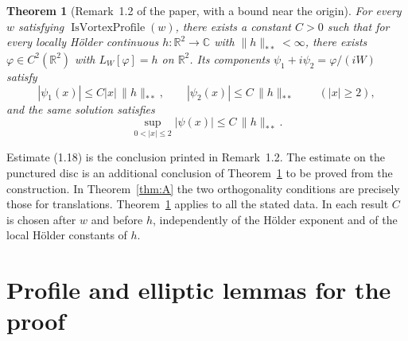 \documentclass[11pt]{amsart}
\newtheorem{theorem}{Theorem}
\theoremstyle{definition}
\newcommand{\C}{\mathbb{C}}
\newcommand{\R}{\mathbb{R}}
\newcommand{\nss}[1]{\lVert #1\rVert_{**}}
\newcommand{\vprofile}{\operatorname{IsVortexProfile}}
\begin{document}
\begin{theorem}[Remark~1.2 of the paper, with a bound near the origin]\label{thm:B}
For every $w$ satisfying $\vprofile(w)$, there exists a constant $C>0$ such
that for every locally H\"older continuous $h\colon\R^2\to\C$ with
$\nss{h}<\infty$, there exists $\varphi\in C^2(\R^2)$ with $L_W[\varphi]=h$ on
$\R^2$. Its components $\psi_1+i\psi_2=\varphi/(iW)$ satisfy
\begin{equation*}
   |\psi_1(x)|\le C |x|\,\nss{h},\qquad |\psi_2(x)|\le C\,\nss{h}
       \qquad (|x|\ge2), \tag{1.18}
\end{equation*}
and the same solution satisfies
\[
    \sup_{0<|x|\le2}|\psi(x)|\le C\,\nss{h}.
\]
\end{theorem}

Estimate (1.18) is the conclusion printed in Remark~1.2. The estimate on the
punctured disc is an additional conclusion of Theorem~\ref{thm:B} to be proved
from the construction. In Theorem~\ref{thm:A} the two orthogonality conditions
are precisely those for translations. Theorem~\ref{thm:B} applies to all the
stated data. In each result $C$ is chosen after $w$ and before $h$, independently
of the H\"older exponent and of the local H\"older constants of $h$.

\section{Profile and elliptic lemmas for the proof}\label{sec:inputs}
\end{document}

